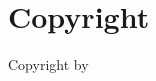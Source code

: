 \chapter*{Copyright}

\begin{center}
	\vfill

	Copyright by\\
	\@author\\
	\the\year

	\vfill
\end{center}